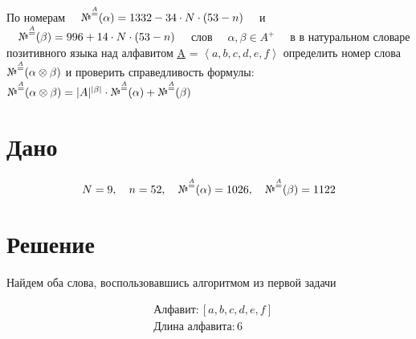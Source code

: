 \documentclass[letterpaper, 11pt]{extarticle}
\begin{document}
\begin{spacing}{1.5}
По номерам $\quad \text{\textnumero}^{\stackrel{A}{=}} (\alpha) = 1332 - 34 \cdot N 
\cdot (53 - n) \quad $ и $\quad \text{\textnumero}^{\stackrel{A}{=}} (\beta) = 
996 + 14 \cdot 
N \cdot (53 - n) \quad$ слов $\quad \alpha, \beta \in A^{+} \quad$ в в натуральном словаре позитивного 
языка над алфавитом \underline{\underline{A}} = $\left<a,b,c,d,e,f\right>$ 
определить номер слова $\text{\textnumero}^{\stackrel{A}{=}} (\alpha \otimes \beta)$ 
и проверить справедливость формулы:\\ 
$\text{\textnumero}^{\stackrel{A}{=}} 
(\alpha \otimes \beta) = |A|^{|\beta|} \cdot \text{\textnumero}^{\stackrel{A}{=}} 
(\alpha) + \text{\textnumero}^{\stackrel{A}{=}} (\beta)$
\end{spacing}

\section*{Дано}

\begin{equation*}
    N = 9, \quad n = 52, \quad 
    \text{\textnumero}^{\stackrel{A}{=}} (\alpha) = 1026, \quad
    \text{\textnumero}^{\stackrel{A}{=}} (\beta) = 1122
\end{equation*}

\section*{Решение}

Найдем оба слова, воспользовавшись алгоритмом из первой задачи

\newpage

\begin{align*}
    & \text{Алфавит}: [a, b, c, d, e, f] \\ 
    & \text{Длина алфавита}: 6
\end{align*}

\setlength{\columnsep}{20pt} %
\setlength{\columnseprule}{0.4pt} %
\end{document}
